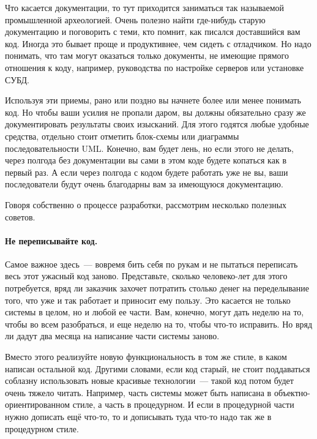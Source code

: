 \documentclass{../../text-style}
\begin{document}
Что касается документации, то тут приходится заниматься так называемой промышленной археологией. Очень полезно найти где-нибудь старую документацию и поговорить с теми, кто помнит, как писался доставшийся вам код. Иногда это бывает проще и продуктивнее, чем сидеть с отладчиком. Но надо понимать, что там могут оказаться только документы, не имеющие прямого отношения к коду, например, руководства по настройке серверов или установке СУБД.

Используя эти приемы, рано или поздно вы начнете более или менее понимать код. Но чтобы ваши усилия не пропали даром, вы должны обязательно сразу же документировать результаты своих изысканий. Для этого годятся любые удобные средства, отдельно стоит отметить блок-схемы или диаграммы последовательности UML. Конечно, вам будет лень, но если этого не делать, через полгода без документации вы сами в этом коде будете копаться как в первый раз. А если через полгода с кодом будете работать уже не вы, ваши последователи будут очень благодарны вам за имеющуюся документацию.

Говоря собственно о процессе разработки, рассмотрим несколько полезных советов.

\paragraph{Не переписывайте код.} Самое важное здесь~--- вовремя бить себя по рукам и не пытаться переписать весь этот ужасный код заново. Представьте, сколько человеко-лет для этого потребуется, вряд ли заказчик захочет потратить столько денег на переделывание того, что уже и так работает и приносит ему пользу. Это касается не только системы в целом, но и любой ее части. Вам, конечно, могут дать неделю на то, чтобы во всем разобраться, и еще неделю на то, чтобы что-то исправить. Но вряд ли дадут два месяца на написание части системы заново.

Вместо этого реализуйте новую функциональность в том же стиле, в каком написан остальной код. Другими словами, если код старый, не стоит поддаваться соблазну использовать новые красивые технологии~--- такой код потом будет очень тяжело читать. Например, часть системы может быть написана в объектно-ориентированном стиле, а часть в процедурном. И если в процедурной части нужно дописать ещё что-то, то и дописывать туда что-то надо так же в процедурном стиле.
\end{document}
